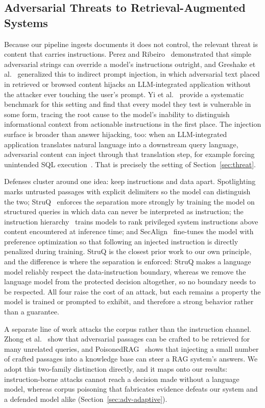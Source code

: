 \documentclass[conference]{IEEEtran}
\begin{document}
\subsection{Adversarial Threats to Retrieval-Augmented Systems}
Because our pipeline ingests documents it does not control, the relevant
threat is content that carries instructions. Perez and
Ribeiro~\cite{perez2022ignore} demonstrated that simple adversarial strings
can override a model's instructions outright, and Greshake et
al.~\cite{greshake2023injection} generalized this to indirect prompt
injection, in which adversarial text placed in retrieved or browsed content
hijacks an LLM-integrated application without the attacker ever touching the
user's prompt. Yi et al.~\cite{yi2025bipia} provide a systematic benchmark for
this setting and find that every model they test is vulnerable in some
form, tracing the root cause to the model's inability to distinguish
informational context from actionable instructions in the first place. The
injection surface is broader than answer hijacking, too: when an
LLM-integrated application translates natural language into a downstream
query language, adversarial content can inject through that translation
step, for example forcing unintended SQL
execution~\cite{pedro2025promptsql}. That is precisely the setting of
Section~\ref{sec:threat}.

Defenses cluster around one idea: keep instructions and data apart.
Spotlighting~\cite{hines2024spotlighting} marks untrusted passages with
explicit delimiters so the model can distinguish the two;
StruQ~\cite{chen2025struq} enforces the separation more strongly by training
the model on structured queries in which data can never be interpreted as
instruction; the instruction hierarchy~\cite{wallace2024hierarchy} trains
models to rank privileged system instructions above content encountered at
inference time; and SecAlign~\cite{chen2025secalign} fine-tunes the model
with preference optimization so that following an injected instruction is
directly penalized during training. StruQ is the closest prior work to our
own principle, and the
difference is where the separation is enforced: StruQ makes a language model
reliably respect the data-instruction boundary, whereas we remove the language
model from the protected decision altogether, so no boundary needs to be
respected. All four raise the cost of an attack, but each remains a property
the model is trained or prompted to exhibit, and therefore a strong behavior
rather than a guarantee.

A separate line of work attacks the corpus rather than the instruction
channel. Zhong et al.~\cite{zhong2023poisoning} show that adversarial passages
can be crafted to be retrieved for many unrelated queries, and
PoisonedRAG~\cite{zou2025poisonedrag} shows that injecting a small number of
crafted passages into a knowledge base can steer a RAG system's answers. We
adopt this two-family distinction directly, and it maps onto our results:
instruction-borne attacks cannot reach a decision made without a language
model, whereas corpus poisoning that fabricates evidence defeats our system
and a defended model alike (Section~\ref{sec:adv-adaptive}).
\end{document}
